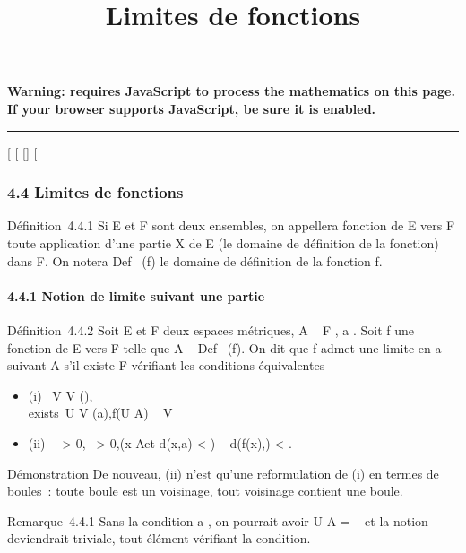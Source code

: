 \documentclass[]{article}
\title{Limites de fonctions}
\author{}
\date{}
\begin{document}
\maketitle

\textbf{Warning: 
requires JavaScript to process the mathematics on this page.\\ If your
browser supports JavaScript, be sure it is enabled.}

\begin{center}\rule{3in}{0.4pt}\end{center}

[
[
[]
[

\subsubsection{4.4 Limites de fonctions}

Définition~4.4.1 Si E et F sont deux ensembles, on appellera fonction de
E vers F toute application d'une partie X de E (le domaine de définition
de la fonction) dans F. On notera Def~ (f) le
domaine de définition de la fonction f.

\paragraph{4.4.1 Notion de limite suivant une partie}

Définition~4.4.2 Soit E et F deux espaces métriques, A \subset~ F , a
\in\overlineA. Soit f une fonction de E vers F telle
que A \subset~ Def~ (f). On dit que f admet une limite
en a suivant A s'il existe \ell \in F vérifiant les conditions équivalentes

\begin{itemize}
\itemsep1pt\parskip0pt
\item
  (i) \forall~V \in V (\ell), \\exists~U
  \in V (a),\quad f(U \bigcap A) \subset~ V
\item
  (ii) \forall~~\epsilon > 0,
  \exists~\eta > 0,\quad (x
  \in A\text et d(x,a) < \eta) \rigtharrow~ d(f(x),\ell)
  < \epsilon.
\end{itemize}

Démonstration De nouveau, (ii) n'est qu'une reformulation de (i) en
termes de boules~: toute boule est un voisinage, tout voisinage contient
une boule.

Remarque~4.4.1 Sans la condition a \in\overlineA, on
pourrait avoir U \bigcap A = \varnothing~ et la notion deviendrait triviale, tout élément
\ell vérifiant la condition.
\end{document}
